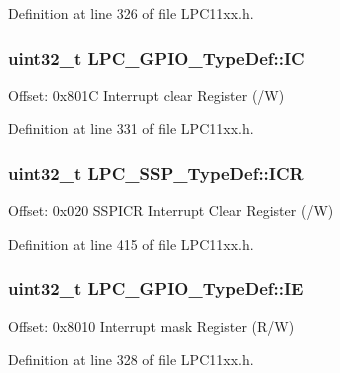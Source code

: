 Definition at line 326 of file L\+P\+C11xx.\+h.

\subsubsection[{\texorpdfstring{IC}{IC}}]{ uint32\+\_\+t L\+P\+C\+\_\+\+G\+P\+I\+O\+\_\+\+Type\+Def\+::\+IC}\hypertarget{group___l_p_c11xx___definitions_ga68ef5e6a1ea080bada52390c13d4c650}{}\label{group___l_p_c11xx___definitions_ga68ef5e6a1ea080bada52390c13d4c650}
Offset\+: 0x801C Interrupt clear Register (/W) 

Definition at line 331 of file L\+P\+C11xx.\+h.

\subsubsection[{\texorpdfstring{I\+CR}{ICR}}]{ uint32\+\_\+t L\+P\+C\+\_\+\+S\+S\+P\+\_\+\+Type\+Def\+::\+I\+CR}\hypertarget{group___l_p_c11xx___definitions_gaf9041aa351c3158fe05a163192abac34}{}\label{group___l_p_c11xx___definitions_gaf9041aa351c3158fe05a163192abac34}
Offset\+: 0x020 S\+S\+P\+I\+CR Interrupt Clear Register (/W) 

Definition at line 415 of file L\+P\+C11xx.\+h.

\subsubsection[{\texorpdfstring{IE}{IE}}]{ uint32\+\_\+t L\+P\+C\+\_\+\+G\+P\+I\+O\+\_\+\+Type\+Def\+::\+IE}\hypertarget{group___l_p_c11xx___definitions_gac02a984a4f5ce3e5851cc7ea9fa23527}{}\label{group___l_p_c11xx___definitions_gac02a984a4f5ce3e5851cc7ea9fa23527}
Offset\+: 0x8010 Interrupt mask Register (R/W) 

Definition at line 328 of file L\+P\+C11xx.\+h.


